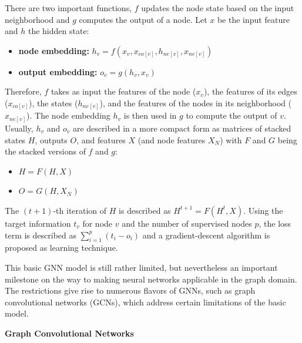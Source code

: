 \documentclass[a4paper,preprint]{sig-alternate}
\begin{document}
There are two important functions, $f$ updates the node state based on the input neighborhood and $g$ computes the output of a node.
Let $x$ be the input feature and $h$ the hidden state:
\begin{itemize}
    \item \textbf{node embedding:} $h_v = f(x_v, x_{co[v]}, h_{ne[v]}, x_{ne[v]})$
    \item \textbf{output embedding:} $o_v = g(h_v, x_v)$
\end{itemize}

Therefore, $f$ takes as input the features of the node ($x_v$), the features of its edges ($x_{co[v]}$), the states ($h_{ne[v]}$),
and the features of the nodes in its neighborhood ($x_{ne[v]}$). The node embedding $h_v$ is then used in $g$ to compute the output of $v$.
Usually, $h_v$ and $o_v$ are described in a more compact form as matrices of stacked states $H$,
outputs $O$, and features $X$ (and node features $X_N$) with $F$ and $G$ being the stacked versions of $f$ and $g$:

\begin{itemize}
    \item $H = F(H, X)$
    \item $O = G(H, X_N)$
\end{itemize}

The $(t + 1)$-th iteration of $H$ is described as $H^{t + 1} = F(H^t, X)$.
Using the target information $t_v$ for node $v$ and the number of supervised nodes $p$, 
the loss term is described as $\sum_{i=1}^p (t_i - o_i)$ and a gradient-descent algorithm is proposed as learning technique.\newline

\vfill
\pagebreak

This basic GNN model is still rather limited, but nevertheless an important milestone on the way to making
neural networks applicable in the graph domain. \cite{Liu_2020}
The restrictions give rise to numerous flavors of GNNs, such as graph convolutional networks (GCNs),
which address certain limitations of the basic model.\newline

\textbf{Graph Convolutional Networks}\newline
\end{document}
